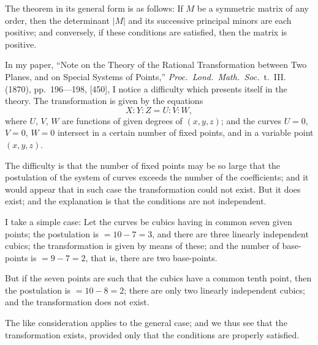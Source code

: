 \documentclass[11pt,a4paper]{book}
\begin{document}
\vspace{0.5em}
The theorem in its general form is as follows: If $M$ be a symmetric matrix of any order, then the determinant $|M|$ and its successive principal minors are each positive; and conversely, if these conditions are satisfied, then the matrix is positive.

\newpage
{}

In my paper, ``Note on the Theory of the Rational Transformation between Two Planes, and on Special Systems of Points,'' \textit{Proc.~Lond.~Math.~Soc.}\ t.~III. (1870), pp.~196---198, [450], I notice a difficulty which presents itself in the theory. The transformation is given by the equations
\[
X : Y : Z = U : V : W,
\]
where $U$, $V$, $W$ are functions of given degrees of $(x, y, z)$; and the curves $U = 0$, $V = 0$, $W = 0$ intersect in a certain number of fixed points, and in a variable point $(x, y, z)$.

\vspace{0.5em}
The difficulty is that the number of fixed points may be so large that the postulation of the system of curves exceeds the number of the coefficients; and it would appear that in such case the transformation could not exist. But it does exist; and the explanation is that the conditions are not independent.

\vspace{0.5em}
I take a simple case: Let the curves be cubics having in common seven given points; the postulation is $= 10 - 7 = 3$, and there are three linearly independent cubics; the transformation is given by means of these; and the number of base-points is $= 9 - 7 = 2$, that is, there are two base-points.

\vspace{0.5em}
But if the seven points are such that the cubics have a common tenth point, then the postulation is $= 10 - 8 = 2$; there are only two linearly independent cubics; and the transformation does not exist.

\vspace{0.5em}
The like consideration applies to the general case; and we thus see that the transformation exists, provided only that the conditions are properly satisfied.
\end{document}
